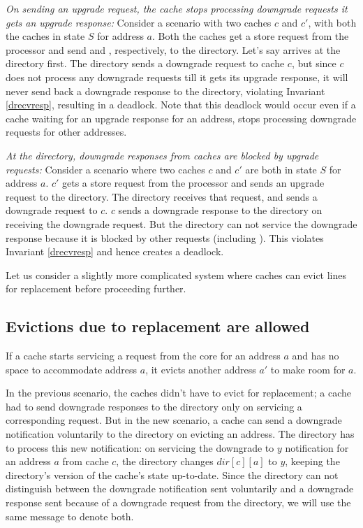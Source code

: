 \begin{scen}
\emph{On sending an upgrade request, the cache stops processing downgrade
requests it gets an upgrade response:}
Consider a scenario with two caches $c$ and $c'$, with both the caches in state
$S$ for address $a$. Both the caches get a store request from the processor and
send  and , respectively, to the directory.
Let's say  arrives at the directory first. The directory
sends a downgrade request to cache $c$, but since $c$ does not process any
downgrade requests till it gets its upgrade response, it will never send back a
downgrade response to the directory, violating Invariant \ref{drecvresp},
resulting in a deadlock. Note that this deadlock would occur even if a cache
waiting for an upgrade response for an address, stops processing downgrade
requests for other addresses.
\label{noprocess}
\end{scen}

\begin{scen}
\emph{At the directory, downgrade responses from caches are blocked by upgrade
requests:}
Consider a scenario where two caches $c$ and $c'$ are both in state $S$ for
address $a$. $c'$ gets a store request from the processor and sends an upgrade
request  to the directory. The directory receives that
request, and sends a downgrade request  to $c$. $c$ sends a
downgrade response  to the directory on receiving the
downgrade request. But the directory can not service the downgrade response because
it is blocked by other requests (including ). This violates
Invariant \ref{drecvresp} and hence creates a deadlock.
\label{scen:block}
\end{scen}

Let us consider a slightly more complicated system where caches can evict lines
for replacement before proceeding further.

\subsection{Evictions due to replacement are allowed}
If a cache starts servicing a request from the core for an address $a$ and has
no space to accommodate address $a$, it evicts another address $a'$ to make room
for $a$.

In the previous scenario, the caches didn't have to evict for replacement; a
cache had to send downgrade responses to the directory only on servicing a
corresponding request. But in the new scenario, a cache can send a downgrade
notification voluntarily to the directory on evicting an address. The directory
has to process this new notification: on servicing the downgrade to $y$
notification for an address $a$ from cache $c$, the directory changes
$dir[c][a]$ to $y$, keeping the directory's version of the cache's state
up-to-date. Since the directory can not distinguish between the downgrade
notification sent voluntarily and a downgrade response sent because of a
downgrade request from the directory, we will use the same message to denote
both.

